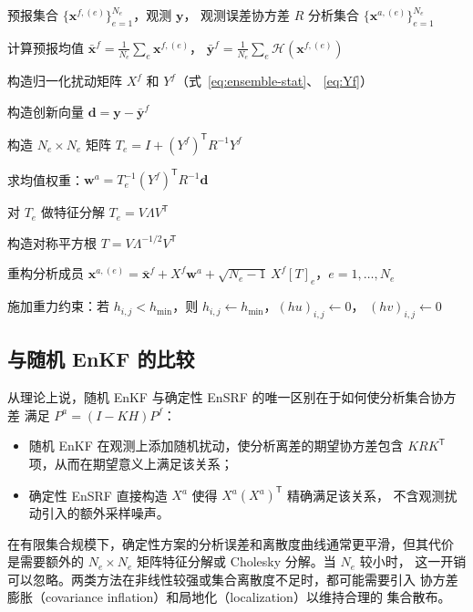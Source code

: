 \documentclass[12pt,a4paper]{article}
\newcommand{\x}{\bm{x}}
\newcommand{\y}{\bm{y}}
\newcommand{\w}{\bm{w}}
\newcommand{\T}{^{\mathsf T}}
\newcommand{\calH}{\mathcal{H}}
\begin{document}
\begin{algorithm}[htbp]
  \caption{对称平方根 EnSRF 分析步}
  \label{alg:ensrf}
  \begin{algorithmic}[1]
    \Require 预报集合 $\{\x^{f,(e)}\}_{e=1}^{N_e}$，观测 $\y$，
             观测误差协方差 $R$
    \Ensure 分析集合 $\{\x^{a,(e)}\}_{e=1}^{N_e}$

    \State 计算预报均值 $\bar{\x}^f = \frac{1}{N_e}\sum_e \x^{f,(e)}$，
           $\bar{\y}^f = \frac{1}{N_e}\sum_e \calH(\x^{f,(e)})$

    \State 构造归一化扰动矩阵 $X^f$ 和 $Y^f$（式~\eqref{eq:ensemble-stat}、
           \eqref{eq:Yf}）

    \State 构造创新向量 $\mathbf{d} = \y - \bar{\y}^f$

    \State 构造 $N_e \times N_e$ 矩阵 $T_e = I + (Y^f)\T R^{-1} Y^f$

    \State 求均值权重：$\w^a = T_e^{-1} (Y^f)\T R^{-1} \mathbf{d}$

    \State 对 $T_e$ 做特征分解 $T_e = V \Lambda V\T$

    \State 构造对称平方根 $T = V \Lambda^{-1/2} V\T$

    \State 重构分析成员 $\x^{a,(e)} = \bar{\x}^f + X^f\w^a
           + \sqrt{N_e-1}\,X^f[T]_e$，$e = 1,\dots,N_e$

    \State 施加重力约束：若 $h_{i,j} < h_{\min}$，则
           $h_{i,j} \leftarrow h_{\min}$，$(hu)_{i,j} \leftarrow 0$，
           $(hv)_{i,j} \leftarrow 0$
  \end{algorithmic}
\end{algorithm}

\subsection{与随机 EnKF 的比较}

从理论上说，随机 EnKF 与确定性 EnSRF 的唯一区别在于如何使分析集合协方差
满足 $P^a = (I - KH)P^f$：
\begin{itemize}
  \item 随机 EnKF 在观测上添加随机扰动，使分析离差的期望协方差包含 $K R K\T$
        项，从而在期望意义上满足该关系；
  \item 确定性 EnSRF 直接构造 $X^a$ 使得 $X^a(X^a)\T$ 精确满足该关系，
        不含观测扰动引入的额外采样噪声。
\end{itemize}

在有限集合规模下，确定性方案的分析误差和离散度曲线通常更平滑，但其代价
是需要额外的 $N_e \times N_e$ 矩阵特征分解或 Cholesky 分解。当 $N_e$ 较小时，
这一开销可以忽略。两类方法在非线性较强或集合离散度不足时，都可能需要引入
协方差膨胀（covariance inflation）和局地化（localization）以维持合理的
集合散布。
\end{document}
